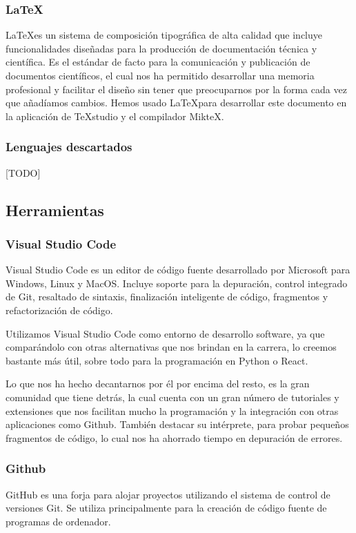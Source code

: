 \subsubsection*{\LaTeX}
\LaTeX\space es un sistema de composición tipográfica de alta calidad que incluye funcionalidades diseñadas para la producción de documentación técnica y científica. Es el estándar de facto para la comunicación y publicación de documentos científicos, el cual nos ha permitido desarrollar una memoria profesional y facilitar el diseño sin tener que preocuparnos por la forma cada vez que añadíamos cambios.       
Hemos usado \LaTeX\space para desarrollar este documento en la aplicación de TeXstudio y el compilador MikteX.

\subsubsection{Lenguajes descartados} 

[TODO]

\subsection{Herramientas} 

\subsubsection*{Visual Studio Code}
Visual Studio Code es un editor de código fuente desarrollado por Microsoft para Windows, Linux y MacOS. Incluye soporte para la depuración, control integrado de Git, resaltado de sintaxis, finalización inteligente de código, fragmentos y refactorización de código. 

Utilizamos Visual Studio Code como entorno de desarrollo software, ya que comparándolo con otras alternativas que nos brindan en la carrera, lo creemos bastante más útil, sobre todo para la programación en Python o React.

Lo que nos ha hecho decantarnos por él por encima del resto, es la gran comunidad que tiene detrás, la cual cuenta con un gran número de tutoriales y extensiones que nos facilitan mucho la programación y la integración con otras aplicaciones como Github. También destacar su intérprete, para probar pequeños fragmentos de código, lo cual nos ha ahorrado tiempo en depuración de errores.

\subsubsection*{Github}
GitHub es una forja para alojar proyectos utilizando el sistema de control de versiones Git. Se utiliza principalmente para la creación de código fuente de programas de ordenador.  

